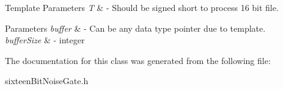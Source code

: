 \begin{DoxyTemplParams}{Template Parameters}
{\em T} & -\/ Should be signed short to process 16 bit file. \\
\hline
\end{DoxyTemplParams}

\begin{DoxyParams}{Parameters}
{\em buffer} & -\/ Can be any data type pointer due to template. \\
\hline
{\em buffer\+Size} & -\/ integer \\
\hline
\end{DoxyParams}


The documentation for this class was generated from the following file\+:\begin{DoxyCompactItemize}
\item 
sixteen\+Bit\+Noise\+Gate.\+h\end{DoxyCompactItemize}
